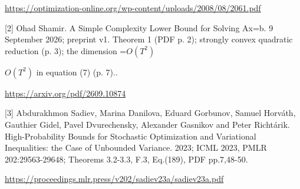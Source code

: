\documentclass[10pt,a4paper]{article}
\newcommand{\AtlasMath}[1]{\par\begingroup\centering\setbox0=\hbox{$\displaystyle #1$}\ifdim\wd0>1.4\linewidth\typeout{ATLAS WIDE FORMULA: \the\wd0}\fi\ifdim\wd0>\linewidth\resizebox{\linewidth}{!}{\box0}\else\box0\fi\par\endgroup}
\newcommand{\AtlasInlineMath}[1]{\begingroup\setbox0=\hbox{$#1$}\ifdim\wd0>.4\linewidth\endgroup\AtlasMath{#1}\else\endgroup$#1$\fi}
\begin{document}
\url{https://optimization-online.org/wp-content/uploads/2008/08/2061.pdf}

[2] Ohad Shamir. A Simple Complexity Lower Bound for Solving Ax=b. 9 September 2026; preprint v1. Theorem 1 (PDF p. 2); strongly convex quadratic reduction (p. 3); the dimension \AtlasInlineMath{O(T^2)} in equation (7) (p. 7)..

\url{https://arxiv.org/pdf/2609.10874}

[3] Abdurakhmon Sadiev, Marina Danilova, Eduard Gorbunov, Samuel Horváth, Gauthier Gidel, Pavel Dvurechensky, Alexander Gasnikov and Peter Richtárik. High-Probability Bounds for Stochastic Optimization and Variational Inequalities: the Case of Unbounded Variance. 2023; ICML 2023, PMLR 202:29563-29648; Theorems 3.2-3.3, F.3, Eq.(189), PDF pp.7,48-50.

\url{https://proceedings.mlr.press/v202/sadiev23a/sadiev23a.pdf}
\end{document}
